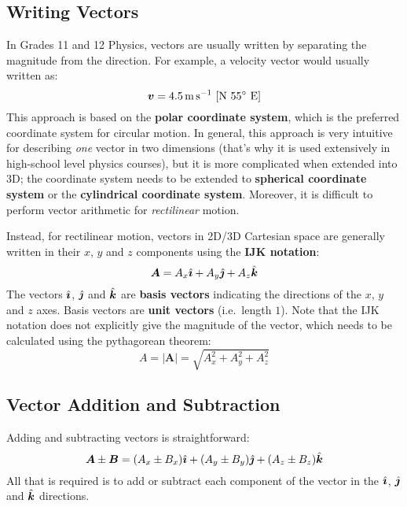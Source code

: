 \documentclass{../../oss-handout}
\newcommand{\iii}{\ensuremath\hat{\bm\imath}}
\newcommand{\jjj}{\ensuremath\hat{\bm\jmath}}
\newcommand{\kkk}{\ensuremath\hat{\bm k}}
\begin{document}
\subsection{Writing Vectors}
In Grades 11 and 12 Physics, vectors are usually written by separating the
magnitude from the direction. For example, a velocity vector would usually
written as:
\begin{equation*}
  \bm v=\SI{4.5}{\metre\per\second}\text{ [N \ang{55} E]}
\end{equation*}
This approach is based on the \textbf{polar coordinate system}, which is the
preferred coordinate system for circular motion. In general, this approach is
very intuitive for describing \emph{one} vector in two dimensions (that's why
it is used extensively in high-school level physics courses), but it is more
complicated when extended into 3D; the coordinate system needs to be extended
to \textbf{spherical coordinate system} or the \textbf{cylindrical coordinate
  system}. Moreover, it is difficult to perform vector arithmetic for
\emph{rectilinear} motion.

Instead, for rectilinear motion, vectors in 2D/3D Cartesian space are generally
written in their $x$, $y$ and $z$ components using the \textbf{IJK notation}:
\begin{equation*}
  \bm A=A_x\iii + A_y\jjj + A_z\kkk
\end{equation*}
The vectors $\iii$, $\jjj$ and $\kkk$ are \textbf{basis vectors} indicating the
directions of the $x$, $y$ and $z$ axes. Basis vectors are
\textbf{unit vectors} (i.e.\ length $1$). Note that the IJK notation does not
explicitly give the magnitude of the vector, which needs to be calculated using
the pythagorean theorem:
\begin{equation*}
  A=|\bm A|=\sqrt{A_x^2 + A_y^2 + A_z^2}
\end{equation*}


\subsection{Vector Addition and Subtraction}

Adding and subtracting vectors is straightforward:
\begin{equation*}
  \bm A\pm\bm B= (A_x\pm B_x)\iii + (A_y\pm B_y)\jjj + (A_z\pm B_z)\kkk
\end{equation*}
All that is required is to add or subtract each component of the vector in the
$\iii$, $\jjj$ and $\kkk$ directions.
\end{document}
